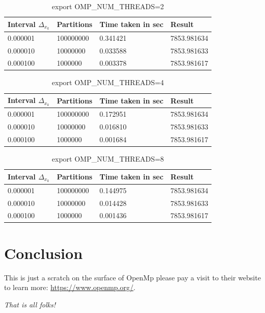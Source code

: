 		\begin{table}[h]
			\caption{export OMP\_NUM\_THREADS=2}
			\begin{center}
				\begin{tabular}{|l|l|l|l|}
					\hline
					Interval $\Delta_{x_k}$  &  Partitions  &  Time taken in sec &  Result \\
					\hline
					0.000001  &  100000000  &  0.341421  &  7853.981634 \\
					\hline
					0.000010  &  10000000  &  0.033588  &  7853.981633 \\
					\hline
					0.000100  &  1000000  &  0.003378  &  7853.981617 \\
					\hline
				\end{tabular}
			\end{center}
		\end{table}
		
		\begin{table}[h]
			\caption{export OMP\_NUM\_THREADS=4}
			\begin{center}
				\begin{tabular}{|l|l|l|l|}
					\hline
					Interval $\Delta_{x_k}$  &  Partitions  &  Time taken in sec &  Result \\
					\hline
					0.000001  &  100000000  &  0.172951  &  7853.981634 \\
					\hline
					0.000010  &  10000000  &  0.016810  &  7853.981633 \\
					\hline
					0.000100  &  1000000  &  0.001684  &  7853.981617 \\
					\hline
				\end{tabular}
			\end{center}
		\end{table}
			
		\begin{table}[h]
			\caption{export OMP\_NUM\_THREADS=8}
			\begin{center}
				\begin{tabular}{|l|l|l|l|}
					\hline
					Interval $\Delta_{x_k}$  &  Partitions  &  Time taken in sec &  Result \\
					\hline
					0.000001  &  100000000  &  0.144975  &  7853.981634 \\
					\hline
					0.000010  &  10000000  &  0.014428  &  7853.981633 \\
					\hline
					0.000100  &  1000000  &  0.001436  &  7853.981617 \\
					\hline
				\end{tabular}
			\end{center}
		\end{table}
	
	\section{Conclusion}
	\par This is just a scratch on the surface of OpenMp please pay a visit to their website to learn more: \href{https://www.openmp.org/}{https://www.openmp.org/}.
	\par \textit{That is all folks!}
	
	
	

